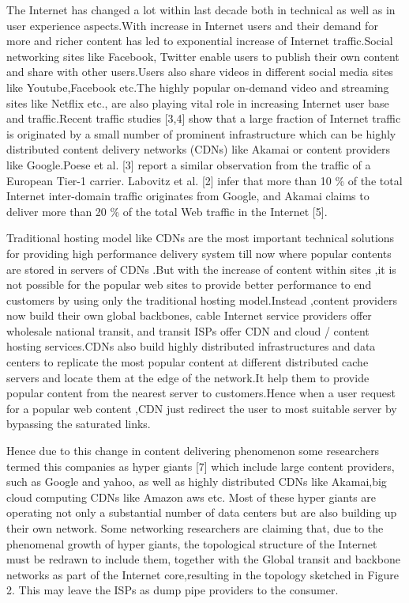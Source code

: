 The Internet has changed a lot within last decade both in technical as well as
in user experience aspects.With increase in Internet users and their demand for
more and richer content has led to exponential increase of Internet traffic.Social
networking sites like Facebook, Twitter enable users to publish their own content
and share with other users.Users also share videos in different social media sites
like Youtube,Facebook etc.The highly popular on-demand video and streaming
sites like Netflix etc., are also playing vital role in increasing Internet user base
and traffic.Recent traffic studies [3,4] show that a large fraction of Internet
traffic is originated by a small number of prominent infrastructure which can be
highly distributed content delivery networks (CDNs) like Akamai or content providers like Google.Poese et al. [3] report a similar observation from the traffic of a European Tier-1 carrier. Labovitz et al. [2] infer that more than 10 \% of the total Internet inter-domain
traffic originates from Google, and Akamai claims to deliver more than 20 \% of
the total Web traffic in the Internet [5].

Traditional hosting model like CDNs are the
most important technical solutions for providing high performance delivery system till now where popular contents are stored in servers of CDNs .But with the
increase of content within sites ,it is not possible for the popular web sites to provide better performance to end customers by using only the traditional hosting
model.Instead ,content providers now build their own global backbones, cable
Internet service providers offer wholesale national transit, and transit ISPs offer
CDN and cloud / content hosting services.CDNs also build highly distributed
infrastructures and data centers to replicate the most popular content at different distributed cache servers and locate them at the edge of the network.It help
them to provide popular content from the nearest server to customers.Hence
when a user request for a popular web content ,CDN just redirect the user to
most suitable server by bypassing the saturated links.

Hence due to this change in content delivering phenomenon some researchers
termed this companies as hyper giants [7] which include large content providers,
such as Google and yahoo, as well as highly distributed CDNs like Akamai,big cloud computing CDNs like Amazon aws etc. Most of these hyper giants are operating not only a substantial number of data centers but are also building up their own network. Some networking
researchers are claiming that, due to the phenomenal growth of hyper giants,
the topological structure of the Internet must be redrawn to include them, together with the Global transit and backbone networks as part of the Internet
core,resulting in the topology sketched in Figure 2. This may leave the ISPs as
dump pipe providers to the consumer.

